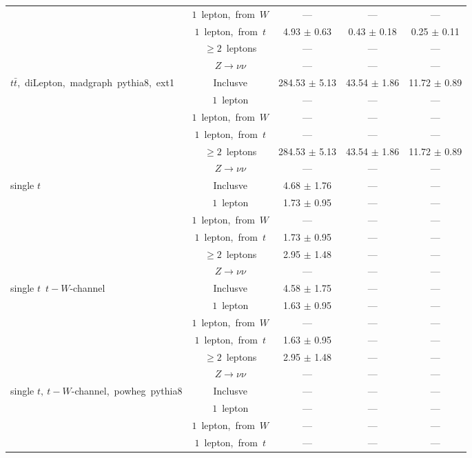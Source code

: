 \documentclass{article}
\begin{document}
\begin{longtable}{|l|c|c|c|c|}
 & $1$~lepton,~from~$W$  & ---  & ---  & --- \\* 
 & $1$~lepton,~from~$t$  & 4.93 $\pm$ 0.63  & 0.43 $\pm$ 0.18  & 0.25 $\pm$ 0.11 \\* 
 & $\ge2$~leptons  & ---  & ---  & --- \\* 
 & $Z\rightarrow\nu\nu$  & ---  & ---  & --- \\* 
\hline 
\multirow{6}{*}{$t\bar{t}$,~diLepton,~madgraph~pythia8,~ext1} & Inclusve  & 284.53 $\pm$ 5.13  & 43.54 $\pm$ 1.86  & 11.72 $\pm$ 0.89 \\* 
 & $1$~lepton  & ---  & ---  & --- \\* 
 & $1$~lepton,~from~$W$  & ---  & ---  & --- \\* 
 & $1$~lepton,~from~$t$  & ---  & ---  & --- \\* 
 & $\ge2$~leptons  & 284.53 $\pm$ 5.13  & 43.54 $\pm$ 1.86  & 11.72 $\pm$ 0.89 \\* 
 & $Z\rightarrow\nu\nu$  & ---  & ---  & --- \\* 
\hline 
\multirow{6}{*}{single $t$} & Inclusve  & 4.68 $\pm$ 1.76  & ---  & --- \\* 
 & $1$~lepton  & 1.73 $\pm$ 0.95  & ---  & --- \\* 
 & $1$~lepton,~from~$W$  & ---  & ---  & --- \\* 
 & $1$~lepton,~from~$t$  & 1.73 $\pm$ 0.95  & ---  & --- \\* 
 & $\ge2$~leptons  & 2.95 $\pm$ 1.48  & ---  & --- \\* 
 & $Z\rightarrow\nu\nu$  & ---  & ---  & --- \\* 
\hline 
\multirow{6}{*}{single $t$~$t-W$-channel} & Inclusve  & 4.58 $\pm$ 1.75  & ---  & --- \\* 
 & $1$~lepton  & 1.63 $\pm$ 0.95  & ---  & --- \\* 
 & $1$~lepton,~from~$W$  & ---  & ---  & --- \\* 
 & $1$~lepton,~from~$t$  & 1.63 $\pm$ 0.95  & ---  & --- \\* 
 & $\ge2$~leptons  & 2.95 $\pm$ 1.48  & ---  & --- \\* 
 & $Z\rightarrow\nu\nu$  & ---  & ---  & --- \\* 
\hline 
\multirow{6}{*}{single $t,~t-W$-channel,~powheg~pythia8} & Inclusve  & ---  & ---  & --- \\* 
 & $1$~lepton  & ---  & ---  & --- \\* 
 & $1$~lepton,~from~$W$  & ---  & ---  & --- \\* 
 & $1$~lepton,~from~$t$  & ---  & ---  & --- \\* 

\end{longtable}
\end{document}
